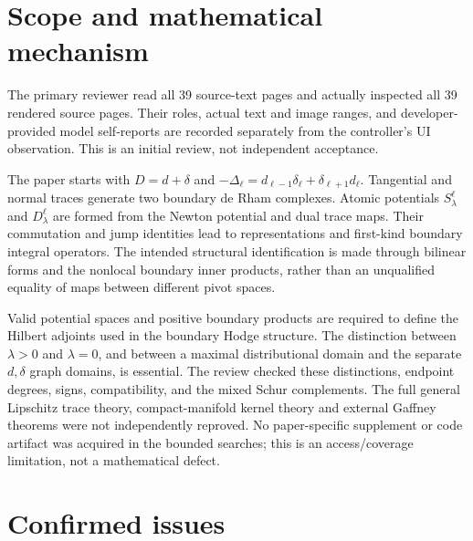 \documentclass[10pt]{article}
\begin{document}
\section*{Scope and mathematical mechanism}
The primary reviewer read all 39 source-text pages and actually inspected all 39 rendered source pages. Their roles, actual text and image ranges, and developer-provided model self-reports are recorded separately from the controller’s UI observation. This is an initial review, not independent acceptance.\par
The paper starts with \(D=d+\delta\) and \(-\Delta_\ell=d_{\ell-1}\delta_\ell+\delta_{\ell+1}d_\ell\). Tangential and normal traces generate two boundary de Rham complexes. Atomic potentials \(S_\lambda^\ell\) and \(D_\lambda^\ell\) are formed from the Newton potential and dual trace maps. Their commutation and jump identities lead to representations and first-kind boundary integral operators. The intended structural identification is made through bilinear forms and the nonlocal boundary inner products, rather than an unqualified equality of maps between different pivot spaces.\par
Valid potential spaces and positive boundary products are required to define the Hilbert adjoints used in the boundary Hodge structure. The distinction between \(\lambda>0\) and \(\lambda=0\), and between a maximal distributional domain and the separate \(d,\delta\) graph domains, is essential. The review checked these distinctions, endpoint degrees, signs, compatibility, and the mixed Schur complements. The full general Lipschitz trace theory, compact-manifold kernel theory and external Gaffney theorems were not independently reproved. No paper-specific supplement or code artifact was acquired in the bounded searches; this is an access/coverage limitation, not a mathematical defect.\par
\section*{Confirmed issues}
\end{document}
